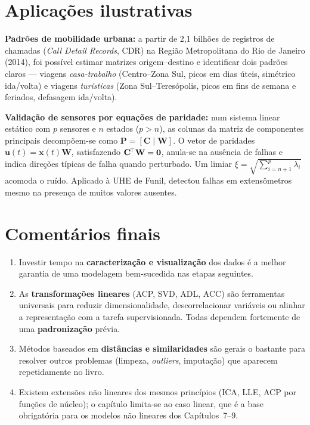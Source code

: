 \section{Aplicações ilustrativas}

\begin{aplicacao}
\textbf{Padrões de mobilidade urbana:} a partir de 2{,}1 bilhões de
registros de chamadas (\emph{Call Detail Records}, CDR) na Região
Metropolitana do Rio de Janeiro (2014), foi possível estimar matrizes
origem--destino e identificar dois padrões claros — viagens
\emph{casa-trabalho} (Centro--Zona Sul, picos em dias úteis, simétrico
ida/volta) e viagens \emph{turísticas} (Zona Sul--Teresópolis, picos em
fins de semana e feriados, defasagem ida/volta).
\end{aplicacao}

\begin{aplicacao}
\textbf{Validação de sensores por equações de paridade:} num sistema
linear estático com $p$ sensores e $n$ estados ($p>n$), as colunas da
matriz de componentes principais decompõem-se como
$\mathbf{P}=[\mathbf{C}\mid\mathbf{W}]$. O vetor de paridades
$\mathbf{u}(t)=\mathbf{x}(t)\mathbf{W}$, satisfazendo
$\mathbf{C}^{\!\top}\mathbf{W}=\mathbf{0}$, anula-se na ausência de falhas e
indica direções típicas de falha quando perturbado. Um limiar
$\xi=\sqrt{\sum_{i=n+1}^{p}\lambda_i}$ acomoda o ruído. Aplicado à UHE
de Funil, detectou falhas em extensômetros mesmo na presença de
muitos valores ausentes.
\end{aplicacao}

\section{Comentários finais}

\begin{enumerate}[leftmargin=1.2cm]
  \item Investir tempo na \textbf{caracterização e visualização} dos
        dados é a melhor garantia de uma modelagem bem-sucedida nas
        etapas seguintes.
  \item As \textbf{transformações lineares} (ACP, SVD, ADL, ACC) são
        ferramentas universais para reduzir dimensionalidade,
        descorrelacionar variáveis ou alinhar a representação com a
        tarefa supervisionada. Todas dependem fortemente de uma
        \textbf{padronização} prévia.
  \item Métodos baseados em \textbf{distâncias e similaridades} são
        gerais o bastante para resolver outros problemas (limpeza,
        \emph{outliers}, imputação) que aparecem repetidamente no
        livro.
  \item Existem extensões não lineares dos mesmos princípios (ICA,
        LLE, ACP por funções de núcleo); o capítulo limita-se ao caso
        linear, que é a base obrigatória para os modelos não lineares
        dos Capítulos~7--9.
\end{enumerate}


